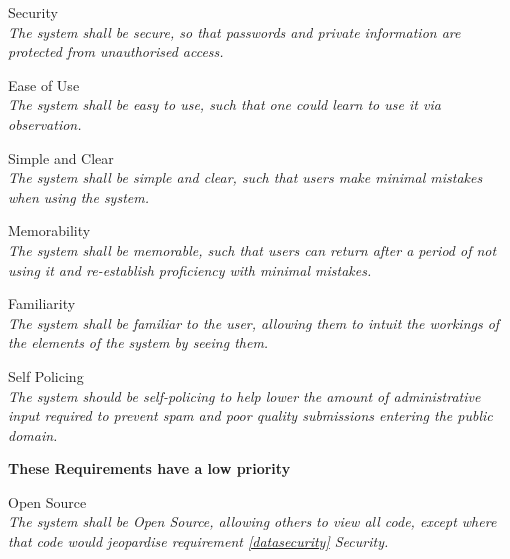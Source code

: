 \begin{requirements}

    \item Security \label{security} \\
	\textit{The system shall be secure, so that passwords and private information are protected from unauthorised access.}

    \item Ease of Use \label{easeofuse} \\
	\textit{The system shall be easy to use, such that one could learn to use it via observation.}

    \item Simple and Clear \label{simpleandclear} \\
	\textit{The system shall be simple and clear, such that users make minimal mistakes when using the system.}

    \item Memorability \label{memorability} \\
	\textit{The system shall be memorable, such that users can return after a period of not using it and re-establish proficiency with minimal mistakes.}

    \item Familiarity \label{familiarity} \\
	\textit{The system shall be familiar to the user, allowing them to intuit the workings of the elements of the system by seeing them.}

    \item Self Policing \label{selfpolicing} \\
	\textit{The system should be self-policing to help lower the amount of administrative input required to prevent spam and poor quality submissions entering the public domain.}

\end{requirements}

\textbf{These Requirements have a low priority}

\begin{requirements}[resume]

    \item Open Source \label{opensource} \\
	\textit{The system shall be Open Source, allowing others to view all code, except where that code would jeopardise requirement \ref{datasecurity} Security.}

\end{requirements}


